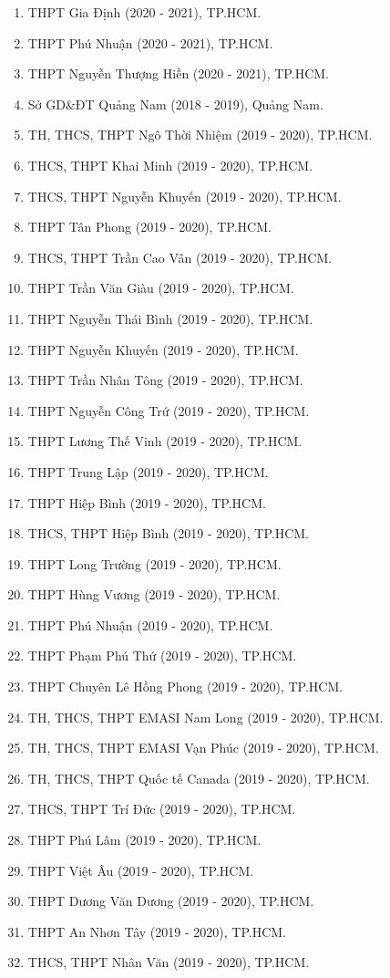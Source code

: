 \whiteBGstarBegin
\setcounter{section}{0}
\begin{enumerate}[label=\bfseries  \arabic*.]
	\item THPT Gia Định (2020 - 2021), TP.HCM.
	\item THPT Phú Nhuận (2020 - 2021), TP.HCM.
	\item THPT Nguyễn Thượng Hiền (2020 - 2021), TP.HCM.
	\item Sở GD\&ĐT Quảng Nam (2018 - 2019), Quảng Nam.
	\item TH, THCS, THPT Ngô Thời Nhiệm (2019 - 2020), TP.HCM.
	\item THCS, THPT Khai Minh (2019 - 2020), TP.HCM.
	\item THCS, THPT Nguyễn Khuyến (2019 - 2020), TP.HCM.
	\item THPT Tân Phong (2019 - 2020), TP.HCM.
	\item THCS, THPT Trần Cao Vân (2019 - 2020), TP.HCM.
	\item THPT Trần Văn Giàu (2019 - 2020), TP.HCM.
	\item THPT Nguyễn Thái Bình (2019 - 2020), TP.HCM.
	\item THPT Nguyễn Khuyến (2019 - 2020), TP.HCM.
	\item THPT Trần Nhân Tông (2019 - 2020), TP.HCM.
	\item THPT Nguyễn Công Trứ (2019 - 2020), TP.HCM.
	\item THPT Lương Thế Vinh (2019 - 2020), TP.HCM.
	\item THPT Trung Lập (2019 - 2020), TP.HCM.
	\item THPT Hiệp Bình (2019 - 2020), TP.HCM.
	\item THCS, THPT Hiệp Bình (2019 - 2020), TP.HCM.
	\item THPT Long Trường (2019 - 2020), TP.HCM.
	\item THPT Hùng Vương (2019 - 2020), TP.HCM.
	\item THPT Phú Nhuận (2019 - 2020), TP.HCM.
	\item THPT Phạm Phú Thứ (2019 - 2020), TP.HCM.
	\item THPT Chuyên Lê Hồng Phong (2019 - 2020), TP.HCM.
	\item TH, THCS, THPT EMASI Nam Long (2019 - 2020), TP.HCM.
	\item TH, THCS, THPT EMASI Vạn Phúc (2019 - 2020), TP.HCM.
	\item TH, THCS, THPT Quốc tế Canada (2019 - 2020), TP.HCM.
	\item THCS, THPT Trí Đức (2019 - 2020), TP.HCM.
	\item THPT Phú Lâm (2019 - 2020), TP.HCM.
	\item THPT Việt Âu (2019 - 2020), TP.HCM.
	\item THPT Dương Văn Dương (2019 - 2020), TP.HCM.
	\item THPT An Nhơn Tây (2019 - 2020), TP.HCM.
	\item THCS, THPT Nhân Văn (2019 - 2020), TP.HCM.
	
\end{enumerate}
